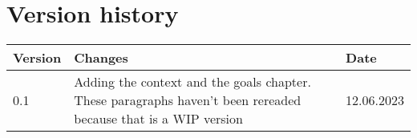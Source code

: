 \chapter{Version history}
\label{chap:spec-versions}

\begin{tabular}{|m{}|m{}|m{}|}
 \hline
 \textbf{Version} & \textbf{Changes} & \textbf{Date} \\ [0.5ex]
 \hline
 0.1 & Adding the context and the goals chapter. These paragraphs haven't been rereaded because that is a WIP version & 12.06.2023  \\
 \hline
\end{tabular}